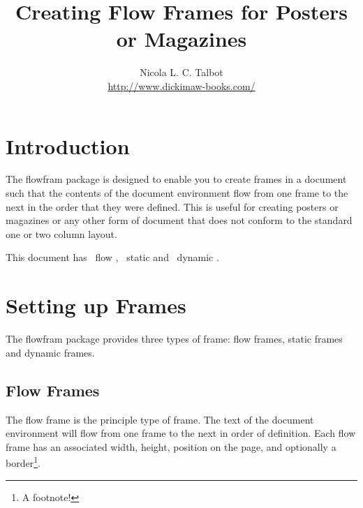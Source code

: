 \documentclass[a4paper,twoside]{book}
\newcommand{\sty}[1]{\textsf{#1}}
\newcommand{\env}[1]{\textsf{#1}}
\begin{document}
\title{Creating Flow Frames for Posters or Magazines}
\author{Nicola L. C. Talbot\\[1cm]\url{http://www.dickimaw-books.com/}}
\date{}
\maketitle

\cleardoublepage
{}

\frontmatter
\tocandthumbtabindex
{}

\clearpage
{}

\mainmatter
\chapter{Introduction}
\enablethumbtabs
{}

The \sty{flowfram} package is designed to enable you to create
frames in a document such that the
contents of the \env{document} environment flow from one
frame to the next in the order that they were defined.
This is useful for creating posters
or magazines or any other form of document that does not
conform to the standard one or two column layout.

This document has \themaxflow\ flow
, \themaxstatic\ static
 and
\themaxdynamic\ dynamic .

\chapter{Setting up Frames}

The \sty{flowfram} package provides three types of frame:
{flow frames}, {static
frames} and {dynamic frames}.

\section{Flow Frames}

The flow frame is the principle type of frame.
The text of the \env{document} environment will flow from
one frame to the next in order of definition. Each
flow frame has an associated width, height,
position on the page, and optionally a border\footnote{A
footnote!}.
\end{document}
